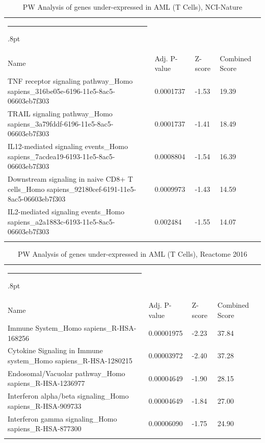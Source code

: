 \documentclass[3p,authoryear,preprint,12pt]{elsarticle}
\makeatletter
\def\hlinewd#1{%
  \noalign{\ifnum0=`}\fi\hrule \@height #1%
  \futurelet\reserved@a\@xhline}
\def\tbltoprule{\hlinewd{.8pt}\\[-12pt]}
\def\tblbottomrule{\noalign{\vspace*{6pt}}\hline\noalign{\vspace*{2pt}}}
\def\tblmidrule{\noalign{\vspace*{6pt}}\hline\noalign{\vspace*{2pt}}}
\makeatother
\begin{document}
\begin{table}[!htbp]
	\caption{{PW Analysis of genes under-expressed in AML (T Cells), NCI-Nature} }
	\label{tw-de478ae31cs6}
	\def\arraystretch{1}
	\ignorespaces 
	\centering 
	\begin{tabulary}{\linewidth}{p{\dimexpr.65\tabcolsep}p{\dimexpr.15\tabcolsep}p{\dimexpr.1\tabcolsep}p{\dimexpr.1\tabcolsep}}
		\tbltoprule Name & Adj. P-value & Z-score & Combined Score\\
		\tblmidrule
TNF receptor signaling pathway\_Homo sapiens\_316be05e-6196-11e5-8ac5-06603eb7f303 & 0.0001737 & -1.53 & 19.39 \\
TRAIL signaling pathway\_Homo sapiens\_3a79fddf-6196-11e5-8ac5-06603eb7f303 & 0.0001737 & -1.41 & 18.49 \\
IL12-mediated signaling events\_Homo sapiens\_7acdea19-6193-11e5-8ac5-06603eb7f303 & 0.0008804 & -1.54 & 16.39 \\
Downstream signaling in naive CD8+ T cells\_Homo sapiens\_92180cef-6191-11e5-8ac5-06603eb7f303 & 0.0009973 & -1.43 & 14.59 \\
IL2-mediated signaling events\_Homo sapiens\_a2a1883c-6193-11e5-8ac5-06603eb7f303 & 0.002484 & -1.55 & 14.07 \\
		\tblbottomrule
	\end{tabulary}\par 
\end{table}
\begin{table}[!htbp]
	\caption{{PW Analysis of genes under-expressed in AML (T Cells), Reactome 2016} }
	\label{tw-de478ae31ct6}
	\def\arraystretch{1}
	\ignorespaces 
	\centering 
	\begin{tabulary}{\linewidth}{p{\dimexpr.65\tabcolsep}p{\dimexpr.15\tabcolsep}p{\dimexpr.1\tabcolsep}p{\dimexpr.1\tabcolsep}}
		\tbltoprule Name & Adj. P-value & Z-score & Combined Score\\
		\tblmidrule
Immune System\_Homo sapiens\_R-HSA-168256 & 0.00001975 & -2.23 & 37.84 \\
Cytokine Signaling in Immune system\_Homo sapiens\_R-HSA-1280215 & 0.00003972 & -2.40 & 37.28 \\
Endosomal/Vacuolar pathway\_Homo sapiens\_R-HSA-1236977 & 0.00004649 & -1.90 & 28.15 \\
Interferon alpha/beta signaling\_Homo sapiens\_R-HSA-909733 & 0.00004649 & -1.84 & 27.00 \\
Interferon gamma signaling\_Homo sapiens\_R-HSA-877300 & 0.00006090 & -1.75 & 24.90 \\
		\tblbottomrule
	\end{tabulary}\par 
\end{table}
\end{document}
